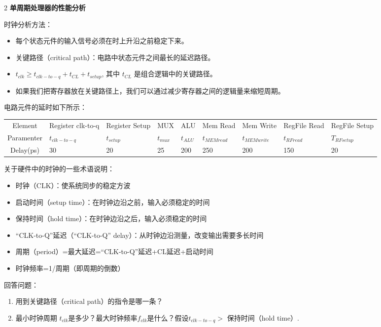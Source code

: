 \documentclass[12pt,a4paper]{article}
\newenvironment{problems}{\begin{list}{}{\renewcommand{\makelabel}[1]{\textbf{##1}.\hfil}}}{\end{list}}
\begin{document}
\begin{problems}
    \item[2] \textbf{单周期处理器的性能分析}
    
    时钟分析方法： 
    \begin{itemize}
        \item 每个状态元件的输入信号必须在时上升沿之前稳定下来。
        \item 关键路径（critical path）：电路中状态元件之间最长的延迟路径。 
        \item $t_{clk} \geq t_{clk-to-q} + t_{CL} + t_{setup}$, 其中 $t_{CL}$ 是组合逻辑中的关键路径。
        \item 如果我们把寄存器放在关键路径上，我们可以通过减少寄存器之间的逻辑量来缩短周期。
    \end{itemize}
    电路元件的延时如下所示：

    \begin{tabular}{c|m{4em}m{4em}m{3em}m{3em}m{4em}m{4em}m{4em}m{4em}}
        Element & Register clk-to-q & Register Setup & MUX & ALU & Mem Read & Mem Write & RegFile Read & RegFile Setup\\
        Paramenter & $t_{clk-to-q}$ & $t_{setup}$ & $t_{mux}$ & $t_{ALU}$ & $t_{MEMread}$ & $t_{MEMwrite}$ & $t_{RFread}$ & $T_{RFsetup}$\\
        \hline
        Delay(ps) & 30 & 20 & 25 & 200 & 250 & 200 & 150 & 20 \\
        \hline
    \end{tabular}
 
    关于硬件中的时钟的一些术语说明：
    \begin{itemize}
        \item 时钟（CLK）：使系统同步的稳定方波
        \item 启动时间（setup time）：在时钟边沿之前，输入必须稳定的时间
        \item 保持时间（hold time）：在时钟边沿之后，输入必须稳定的时间
        \item “CLK-to-Q”延迟（“CLK-to-Q” delay）：从时钟边沿测量，改变输出需要多长时间
        \item 周期（period）=最大延迟=“CLK-to-Q”延迟+CL延迟+启动时间
        \item 时钟频率=1/周期（即周期的倒数）
    \end{itemize}

    回答问题：
    \begin{enumerate}
        \item 用到关键路径（critical path）的指令是哪一条？
        \item 最小时钟周期 $t_{clk}$是多少？最大时钟频率$f_{clk}$是什么？假设$t_{clk-to-q}>$ 保持时间（hold time）. 
    \end{enumerate}


\end{problems}
\end{document}
